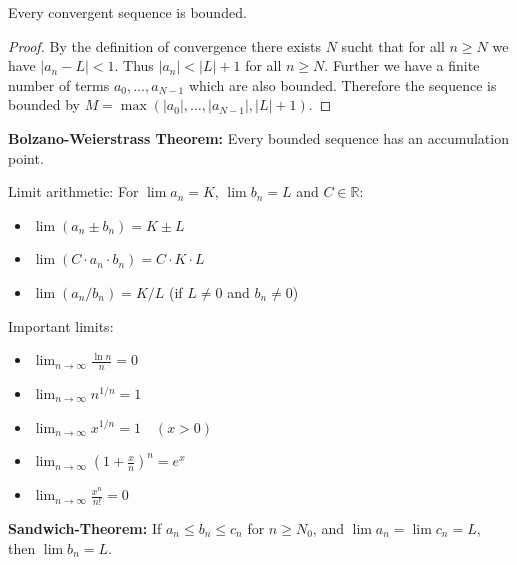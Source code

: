 \begin{theorem}
    Every convergent sequence is bounded.
\end{theorem}

\begin{proof}
    By the definition of convergence there exists $N$ sucht that for all $n \ge N$ we have $|a_n - L| < 1$. Thus $|a_n| < |L| + 1$ for all $n \ge N$. 
    Further we have a finite number of terms $a_0, \dots, a_{N-1}$ which are also bounded. 
    Therefore the sequence is bounded by $M = \max(|a_0|, \dots, |a_{N-1}|, |L| + 1)$.
\end{proof}

\begin{theorem}
    \textbf{Bolzano-Weierstrass Theorem:} Every bounded sequence has an accumulation point.
\end{theorem}

\begin{theorem}
Limit arithmetic: For $\lim a_n = K$, $\lim b_n = L$ and $C \in \mathbb{R}$:
\begin{itemize}
    \item $\lim (a_n \pm b_n) = K \pm L$
    \item $\lim (C \cdot a_n \cdot b_n) = C \cdot K \cdot L$
    \item $\lim (a_n / b_n) = K / L$ (if $L \neq 0$ and $b_n \neq 0$)
\end{itemize}
\end{theorem}

\begin{remark}
    Important limits:
    \begin{itemize}
        \item $\lim_{n \to \infty} \frac{\ln n}{n} = 0$
        \item $\lim_{n \to \infty} n^{1/n} = 1$
        \item $\lim_{n \to \infty} x^{1/n} = 1 \quad (x \gt 0)$
        \item $\lim_{n \to \infty} \left(1 + \frac{x}{n}\right)^n = e^x$
        \item $\lim_{n \to \infty} \frac{x^n}{n!} = 0$
    \end{itemize}
\end{remark}

\begin{theorem}
    \textbf{Sandwich-Theorem:} If $a_n \le b_n \le c_n$ for $n \ge N_0$, and $\lim a_n = \lim c_n = L$, then $\lim b_n = L$.
\end{theorem}

